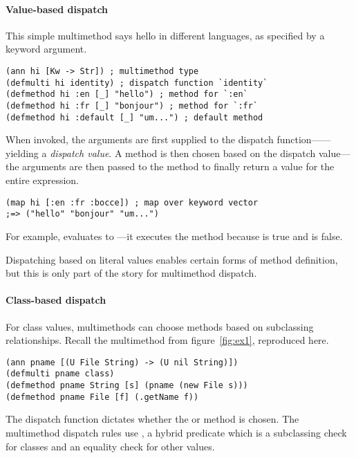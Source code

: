 \paragraph{Value-based dispatch}
This simple multimethod says hello in different languages, as
specified by a keyword argument.

\begin{exmp}
\begin{verbatim}
(ann hi [Kw -> Str]) ; multimethod type
(defmulti hi identity) ; dispatch function `identity`
(defmethod hi :en [_] "hello") ; method for `:en`
(defmethod hi :fr [_] "bonjour") ; method for `:fr`
(defmethod hi :default [_] "um...") ; default method
\end{verbatim}
\label{example:hi-multimethod}
\end{exmp}

When invoked, the arguments are first supplied to the dispatch function------yielding
a \emph{dispatch value}. A method is then chosen
based on the dispatch value---the arguments are then passed to the method
to finally return a value for the entire expression.
%
\begin{verbatim}
(map hi [:en :fr :bocce]) ; map over keyword vector 
;=> ("hello" "bonjour" "um...")
\end{verbatim}
%
For example, 
 evaluates to ---it executes
the  method
because  is true
and  is false.

Dispatching based on literal values enables certain forms of method
definition, but this is only part of the story for multimethod dispatch.

\paragraph{Class-based dispatch}
For class values, multimethods can choose methods based on subclassing
relationships.
%
Recall the multimethod from figure~\ref{fig:ex1}, reproduced here.
\begin{verbatim}
(ann pname [(U File String) -> (U nil String)])
(defmulti pname class)
(defmethod pname String [s] (pname (new File s)))
(defmethod pname File [f] (.getName f))
\end{verbatim}

\noindent
The dispatch function 
dictates 
whether the  or  method is chosen.
%
The multimethod dispatch rules use
, a hybrid predicate which is a subclassing check for classes and
an equality check for other values.

